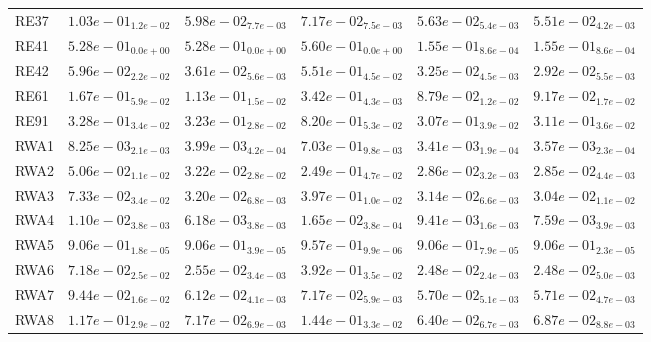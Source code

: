 \documentclass{article}
\begin{document}
\begin{table}
\begin{scriptsize}
\begin{tabular}{llllll}
RE37 & $  1.03e-01_{ 1.2e-02}$ & $  5.98e-02_{ 7.7e-03}$ & $  7.17e-02_{ 7.5e-03}$ & \cellcolor{gray25}$  5.63e-02_{ 5.4e-03}$ & \cellcolor{gray95}$  5.51e-02_{ 4.2e-03}$ \\
RE41 & $  5.28e-01_{ 0.0e+00}$ & $  5.28e-01_{ 0.0e+00}$ & $  5.60e-01_{ 0.0e+00}$ & \cellcolor{gray95}$  1.55e-01_{ 8.6e-04}$ & \cellcolor{gray25}$  1.55e-01_{ 8.6e-04}$ \\
RE42 & $  5.96e-02_{ 2.2e-02}$ & $  3.61e-02_{ 5.6e-03}$ & $  5.51e-01_{ 4.5e-02}$ & \cellcolor{gray25}$  3.25e-02_{ 4.5e-03}$ & \cellcolor{gray95}$  2.92e-02_{ 5.5e-03}$ \\
RE61 & $  1.67e-01_{ 5.9e-02}$ & $  1.13e-01_{ 1.5e-02}$ & $  3.42e-01_{ 4.3e-03}$ & \cellcolor{gray95}$  8.79e-02_{ 1.2e-02}$ & \cellcolor{gray25}$  9.17e-02_{ 1.7e-02}$ \\
RE91 & $  3.28e-01_{ 3.4e-02}$ & $  3.23e-01_{ 2.8e-02}$ & $  8.20e-01_{ 5.3e-02}$ & \cellcolor{gray95}$  3.07e-01_{ 3.9e-02}$ & \cellcolor{gray25}$  3.11e-01_{ 3.6e-02}$ \\
RWA1 & $  8.25e-03_{ 2.1e-03}$ & $  3.99e-03_{ 4.2e-04}$ & $  7.03e-01_{ 9.8e-03}$ & \cellcolor{gray95}$  3.41e-03_{ 1.9e-04}$ & \cellcolor{gray25}$  3.57e-03_{ 2.3e-04}$ \\
RWA2 & $  5.06e-02_{ 1.1e-02}$ & $  3.22e-02_{ 2.8e-02}$ & $  2.49e-01_{ 4.7e-02}$ & \cellcolor{gray25}$  2.86e-02_{ 3.2e-03}$ & \cellcolor{gray95}$  2.85e-02_{ 4.4e-03}$ \\
RWA3 & $  7.33e-02_{ 3.4e-02}$ & $  3.20e-02_{ 6.8e-03}$ & $  3.97e-01_{ 1.0e-02}$ & \cellcolor{gray25}$  3.14e-02_{ 6.6e-03}$ & \cellcolor{gray95}$  3.04e-02_{ 1.1e-02}$ \\
RWA4 & $  1.10e-02_{ 3.8e-03}$ & \cellcolor{gray95}$  6.18e-03_{ 3.8e-03}$ & $  1.65e-02_{ 3.8e-04}$ & $  9.41e-03_{ 1.6e-03}$ & \cellcolor{gray25}$  7.59e-03_{ 3.9e-03}$ \\
RWA5 & $  9.06e-01_{ 1.8e-05}$ & $  9.06e-01_{ 3.9e-05}$ & $  9.57e-01_{ 9.9e-06}$ & \cellcolor{gray25}$  9.06e-01_{ 7.9e-05}$ & \cellcolor{gray95}$  9.06e-01_{ 2.3e-05}$ \\
RWA6 & $  7.18e-02_{ 2.5e-02}$ & $  2.55e-02_{ 3.4e-03}$ & $  3.92e-01_{ 3.5e-02}$ & \cellcolor{gray95}$  2.48e-02_{ 2.4e-03}$ & \cellcolor{gray25}$  2.48e-02_{ 5.0e-03}$ \\
RWA7 & $  9.44e-02_{ 1.6e-02}$ & $  6.12e-02_{ 4.1e-03}$ & $  7.17e-02_{ 5.9e-03}$ & \cellcolor{gray95}$  5.70e-02_{ 5.1e-03}$ & \cellcolor{gray25}$  5.71e-02_{ 4.7e-03}$ \\
RWA8 & $  1.17e-01_{ 2.9e-02}$ & $  7.17e-02_{ 6.9e-03}$ & $  1.44e-01_{ 3.3e-02}$ & \cellcolor{gray95}$  6.40e-02_{ 6.7e-03}$ & \cellcolor{gray25}$  6.87e-02_{ 8.8e-03}$ \\

\end{tabular}
\end{scriptsize}
\end{table}
\end{document}
